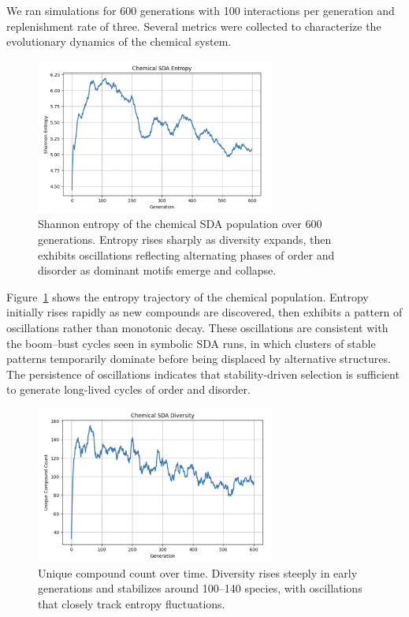 \documentclass[life,article,submit,pdftex,moreauthors]{Definitions/mdpi}
\begin{document}
We ran simulations for 600 generations with 100 interactions per generation and replenishment rate of three. Several metrics were collected to characterize the evolutionary dynamics of the chemical system.  

\begin{figure}[H]
    \centering
    \includegraphics[width=0.7\textwidth]{SDA-chem-entropy.png}
    \caption{Shannon entropy of the chemical SDA population over 600 generations. Entropy rises sharply as diversity expands, then exhibits oscillations reflecting alternating phases of order and disorder as dominant motifs emerge and collapse.}
    \label{fig:chem-entropy}
\end{figure}

Figure~\ref{fig:chem-entropy} shows the entropy trajectory of the chemical population. Entropy initially rises rapidly as new compounds are discovered, then exhibits a pattern of oscillations rather than monotonic decay. These oscillations are consistent with the boom–bust cycles seen in symbolic SDA runs, in which clusters of stable patterns temporarily dominate before being displaced by alternative structures. The persistence of oscillations indicates that stability-driven selection is sufficient to generate long-lived cycles of order and disorder.  

\begin{figure}[H]
    \centering
    \includegraphics[width=0.7\textwidth]{SDA-chem-diversity.png}
    \caption{Unique compound count over time. Diversity rises steeply in early generations and stabilizes around 100–140 species, with oscillations that closely track entropy fluctuations.}
    \label{fig:chem-diversity}
\end{figure}
\end{document}
